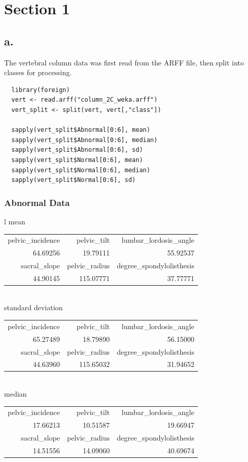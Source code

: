 \documentclass{report}
\begin{document}
\chapter{Section 1}
\section{a.}

The vertebral column data was first read from the ARFF file, then split into classes for processing.

\begin{verbatim}
  library(foreign)
  vert <- read.arff("column_2C_weka.arff")
  vert_split <- split(vert, vert[,"class"])

  sapply(vert_split$Abnormal[0:6], mean)
  sapply(vert_split$Abnormal[0:6], median)
  sapply(vert_split$Abnormal[0:6], sd)
  sapply(vert_split$Normal[0:6], mean)
  sapply(vert_split$Normal[0:6], median)
  sapply(vert_split$Normal[0:6], sd)
\end{verbatim}

\subsection{Abnormal Data}

\begin{tabular}{l}
  mean \\
  \hskip 1.0cm\begin{tabular}{rrr}
    pelvic\_incidence & pelvic\_tilt & lumbar\_lordosis\_angle \\
    64.69256 & 19.79111 & 55.92537 \\
    sacral\_slope & pelvic\_radius & degree\_spondylolisthesis \\
    44.90145 & 115.07771 & 37.77771 \\
  \end{tabular} \\
  standard deviation \\
  \hskip 1.0cm\begin{tabular}{rrr}
    pelvic\_incidence & pelvic\_tilt & lumbar\_lordosis\_angle \\
    65.27489 & 18.79890 & 56.15000 \\
    sacral\_slope & pelvic\_radius & degree\_spondylolisthesis \\
    44.63960 & 115.65032 & 31.94652 \\
  \end{tabular} \\
  median \\
  \hskip 1.0cm\begin{tabular}{rrr}
    pelvic\_incidence & pelvic\_tilt & lumbar\_lordosis\_angle \\
    17.66213 & 10.51587 & 19.66947 \\
    sacral\_slope & pelvic\_radius & degree\_spondylolisthesis \\
    14.51556 & 14.09060 & 40.69674 \\
  \end{tabular}
\end{tabular}
\end{document}
